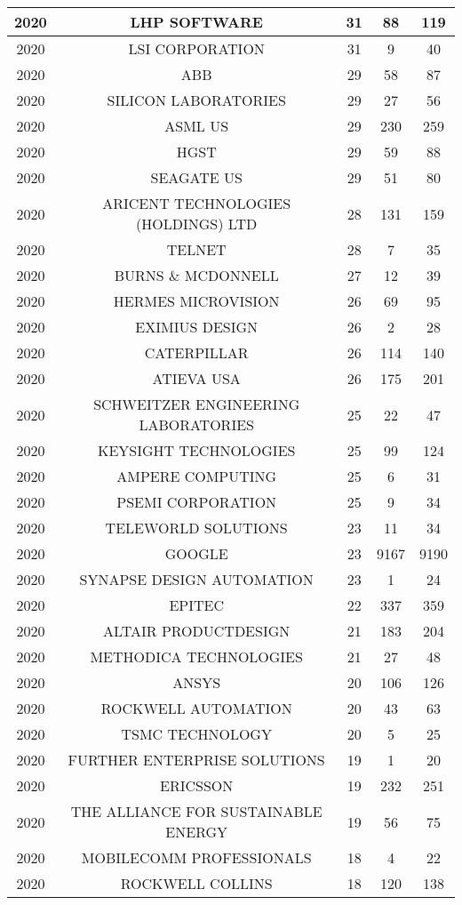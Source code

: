 \documentclass{article}%
\begin{document}
\begin{longtable}{c|c|c|c|c}
\hline%
2020&LHP SOFTWARE&31&88&119\\%
\hline%
2020&LSI CORPORATION&31&9&40\\%
\hline%
2020&ABB&29&58&87\\%
\hline%
2020&SILICON LABORATORIES&29&27&56\\%
\hline%
2020&ASML US&29&230&259\\%
\hline%
2020&HGST&29&59&88\\%
\hline%
2020&SEAGATE US&29&51&80\\%
\hline%
2020&ARICENT TECHNOLOGIES (HOLDINGS) LTD&28&131&159\\%
\hline%
2020&TELNET&28&7&35\\%
\hline%
2020&BURNS \& MCDONNELL&27&12&39\\%
\hline%
2020&HERMES MICROVISION&26&69&95\\%
\hline%
2020&EXIMIUS DESIGN&26&2&28\\%
\hline%
2020&CATERPILLAR&26&114&140\\%
\hline%
2020&ATIEVA USA&26&175&201\\%
\hline%
2020&SCHWEITZER ENGINEERING LABORATORIES&25&22&47\\%
\hline%
2020&KEYSIGHT TECHNOLOGIES&25&99&124\\%
\hline%
2020&AMPERE COMPUTING&25&6&31\\%
\hline%
2020&PSEMI CORPORATION&25&9&34\\%
\hline%
2020&TELEWORLD SOLUTIONS&23&11&34\\%
\hline%
2020&GOOGLE&23&9167&9190\\%
\hline%
2020&SYNAPSE DESIGN AUTOMATION&23&1&24\\%
\hline%
2020&EPITEC&22&337&359\\%
\hline%
2020&ALTAIR PRODUCTDESIGN&21&183&204\\%
\hline%
2020&METHODICA TECHNOLOGIES&21&27&48\\%
\hline%
2020&ANSYS&20&106&126\\%
\hline%
2020&ROCKWELL AUTOMATION&20&43&63\\%
\hline%
2020&TSMC TECHNOLOGY&20&5&25\\%
\hline%
2020&FURTHER ENTERPRISE SOLUTIONS&19&1&20\\%
\hline%
2020&ERICSSON&19&232&251\\%
\hline%
2020&THE ALLIANCE FOR SUSTAINABLE ENERGY&19&56&75\\%
\hline%
2020&MOBILECOMM PROFESSIONALS&18&4&22\\%
\hline%
2020&ROCKWELL COLLINS&18&120&138\\%

\end{longtable}
\end{document}
